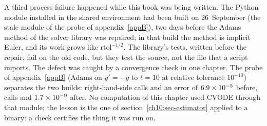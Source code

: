 A third process failure happened while this book was being written. The Python module  installed in the shared environment had been built on
26~September (the stale module of the probe of appendix~\ref{appB}), two days before the Adams method of the solver library was repaired; in that build the method is implicit
Euler, and its work grows like $\mathrm{rtol}^{-1/2}$. The library's tests, written before the repair, fail on the old code, but they test the source, not the file that a script imports.
The defect was caught by a convergence check in one chapter. The probe of appendix~\ref{appB} (Adams on $y'=-y$ to $t=10$ at relative tolerance $10^{-10}$) separates the two
builds: \NxCvodeStaleNfe{} right-hand-side calls and an error of $6.9\times10^{-5}$ before, \NxCvodeFixedNfe{} calls and $1.7\times10^{-9}$ after. No computation of
this chapter used CVODE through that module; the lesson is the one of section~\ref{ch10:sec-estimator} applied to a binary: a check certifies the thing it was run on.

